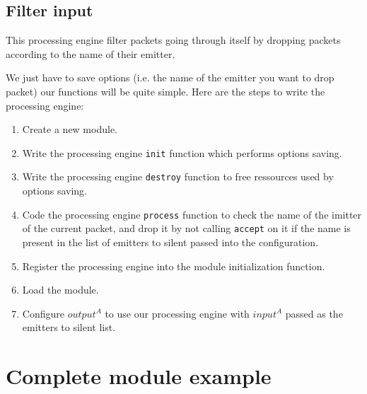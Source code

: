 %
%
\subsection{Filter input}

This processing engine filter packets going through itself by dropping packets
according to the name of their emitter.

We just have to save options (i.e. the name of the emitter you want 
to drop packet) our functions will be quite simple. Here are the steps to 
write the processing engine:

\begin{enumerate}
\item Create a new module.
\item Write the processing engine \texttt{init} function which 
performs options saving.
\item Write the processing engine \texttt{destroy} function to free ressources
used by options saving.
\item Code the processing engine \texttt{process} function to check the name
of the imitter of the current packet, and drop it by not calling 
\texttt{accept} on it if the name is present in the list of emitters to 
silent passed into the configuration.
\item Register the processing engine into the module initialization function.
\item Load the module.
\item Configure $output^A$ to use our processing engine with $input^A$ passed
as the emitters to silent list.
\end{enumerate}

%
%
\section{Complete module example}

